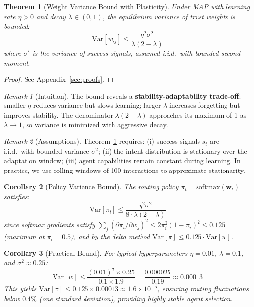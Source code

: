 \documentclass[11pt,a4paper]{article}
\newtheorem{theorem}{Theorem}[section]
\newtheorem{corollary}[theorem]{Corollary}
\theoremstyle{definition}
\theoremstyle{remark}
\newtheorem{remark}{Remark}[section]
\newcommand{\map}{\textsc{MAP}\xspace}
\begin{document}
\begin{theorem}[Weight Variance Bound with Plasticity]
\label{thm:variance-bound}
Under \map with learning rate $\eta > 0$ and decay $\lambda \in (0,1)$, the equilibrium variance of trust weights is bounded:
\begin{equation}
\text{Var}[w_{ij}] \leq \frac{\eta^2 \sigma^2}{\lambda(2-\lambda)}
\end{equation}
where $\sigma^2$ is the variance of success signals, assumed i.i.d.\ with bounded second moment.
\end{theorem}

\begin{proof}
See Appendix~\ref{sec:proofs}.
\end{proof}

\begin{remark}[Intuition]
The bound reveals a \textbf{stability-adaptability trade-off}: smaller $\eta$ reduces variance but slows learning; larger $\lambda$ increases forgetting but improves stability. The denominator $\lambda(2-\lambda)$ approaches its maximum of 1 as $\lambda \to 1$, so variance is minimized with aggressive decay.
\end{remark}

\begin{remark}[Assumptions]
Theorem~\ref{thm:variance-bound} requires: (i) success signals $s_t$ are i.i.d.\ with bounded variance $\sigma^2$; (ii) the intent distribution is stationary over the adaptation window; (iii) agent capabilities remain constant during learning. In practice, we use rolling windows of 100 interactions to approximate stationarity.
\end{remark}

\begin{corollary}[Policy Variance Bound]
\label{cor:policy-variance}
The routing policy $\pi_t = \text{softmax}(\mathbf{w}_t)$ satisfies:
\begin{equation}
\text{Var}[\pi_t] \leq \frac{\eta^2 \sigma^2}{8 \cdot \lambda(2-\lambda)}
\end{equation}
since softmax gradients satisfy $\sum_j (\partial \pi_i / \partial w_j)^2 \leq 2\pi_i^2(1-\pi_i)^2 \leq 0.125$ (maximum at $\pi_i = 0.5$), and by the delta method $\text{Var}[\pi] \leq 0.125 \cdot \text{Var}[w]$.
\end{corollary}

\begin{corollary}[Practical Bound]
For typical hyperparameters $\eta = 0.01$, $\lambda = 0.1$, and $\sigma^2 \approx 0.25$:
\[
\text{Var}[w] \leq \frac{(0.01)^2 \times 0.25}{0.1 \times 1.9} = \frac{0.000025}{0.19} \approx 0.00013
\]
This yields $\text{Var}[\pi] \leq 0.125 \times 0.00013 \approx 1.6 \times 10^{-5}$, ensuring routing fluctuations below $0.4\%$ (one standard deviation), providing highly stable agent selection.
\end{corollary}
\end{document}
